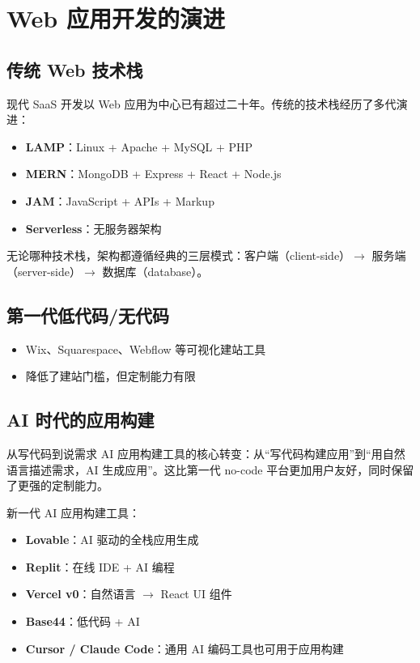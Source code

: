 \section{Web 应用开发的演进}

\subsection{传统 Web 技术栈}

现代 SaaS 开发以 Web 应用为中心已有超过二十年。传统的技术栈经历了多代演进：

\begin{itemize}
    \item \textbf{LAMP}：Linux + Apache + MySQL + PHP
    \item \textbf{MERN}：MongoDB + Express + React + Node.js
    \item \textbf{JAM}：JavaScript + APIs + Markup
    \item \textbf{Serverless}：无服务器架构
\end{itemize}

无论哪种技术栈，架构都遵循经典的三层模式：客户端（client-side）$\rightarrow$ 服务端（server-side）$\rightarrow$ 数据库（database）。

\subsection{第一代低代码/无代码}

\begin{itemize}
    \item Wix、Squarespace、Webflow 等可视化建站工具
    \item 降低了建站门槛，但定制能力有限
\end{itemize}

\subsection{AI 时代的应用构建}

\begin{importantbox}{从写代码到说需求}
AI 应用构建工具的核心转变：从``写代码构建应用''到``用自然语言描述需求，AI 生成应用''。这比第一代 no-code 平台更加用户友好，同时保留了更强的定制能力。
\end{importantbox}

新一代 AI 应用构建工具：
\begin{itemize}
    \item \textbf{Lovable}：AI 驱动的全栈应用生成
    \item \textbf{Replit}：在线 IDE + AI 编程
    \item \textbf{Vercel v0}：自然语言 $\rightarrow$ React UI 组件
    \item \textbf{Base44}：低代码 + AI
    \item \textbf{Cursor / Claude Code}：通用 AI 编码工具也可用于应用构建
\end{itemize}

